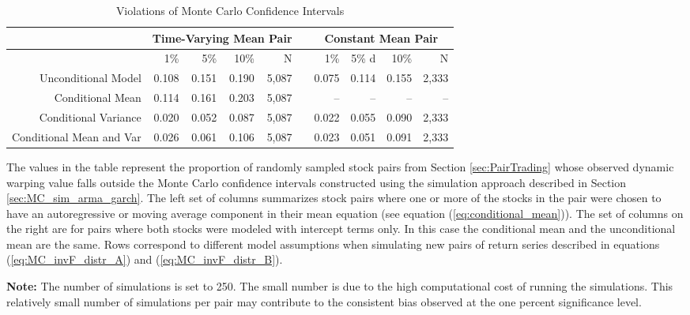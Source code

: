 \documentclass[12pt]{report}
\begin{document}
\begin{table}[!ht]
    \caption{Violations of Monte Carlo Confidence Intervals}
    \fontsize{11pt}{11pt}\selectfont
    \centering
    \begin{tabular}{r r r r r r r r r r}
        \midrule
         & \multicolumn{4}{c}{Time-Varying Mean Pair} & & \multicolumn{4}{c}{Constant Mean Pair}    \\
        \midrule
                                 & 1\%   & 5\%   & 10\%  & N     & & 1\%   & 5\%   d& 10\%  & N     \\
        Unconditional Model      & 0.108 & 0.151 & 0.190 & 5,087 & & 0.075 & 0.114 & 0.155 & 2,333 \\
        Conditional Mean         & 0.114 & 0.161 & 0.203 & 5,087 & &    -- &    -- &    -- &   --  \\
        Conditional Variance     & 0.020 & 0.052 & 0.087 & 5,087 & & 0.022 & 0.055 & 0.090 & 2,333 \\
        Conditional Mean and Var & 0.026 & 0.061 & 0.106 & 5,087 & & 0.023 & 0.051 & 0.091 & 2,333 \\
        \cmidrule{1-10}
    \end{tabular}
    \begin{tablenotes}
        \item{The values in the table represent the proportion of randomly sampled stock pairs from Section \ref{sec:PairTrading} whose observed dynamic warping value falls outside the Monte Carlo confidence intervals constructed using the simulation approach described in Section \ref{sec:MC_sim_arma_garch}. The left set of columns summarizes stock pairs where one or more of the stocks in the pair were chosen to have an autoregressive or moving average component in their mean equation (see equation (\ref{eq:conditional_mean})). The set of columns on the right are for pairs where both stocks were modeled with intercept terms only. In this case the conditional mean and the unconditional mean are the same. Rows correspond to different model assumptions when simulating new pairs of return series described in equations (\ref{eq:MC_invF_distr_A}) and (\ref{eq:MC_invF_distr_B}).}
        \item \textbf{Note:} The number of simulations is set to 250. The small number is due to the high computational cost of running the simulations. This relatively small number of simulations per pair may contribute to the consistent bias observed at the one percent significance level.
    \end{tablenotes}
    \label{tbl:monte_carlo_confidence_intervals}
\end{table}
\end{document}
